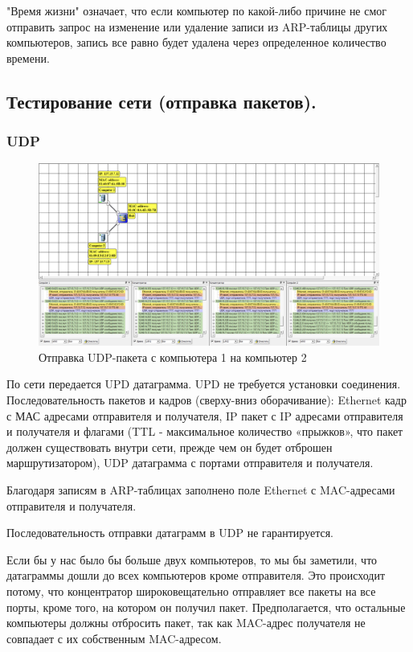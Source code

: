 \documentclass[12pt,onecolumn]{article}
\begin{document}
"Время жизни" означает, что если компьютер по какой-либо причине не смог отправить запрос на изменение или удаление записи из ARP-таблицы других компьютеров, запись все равно будет удалена через определенное количество времени.

\subsection{Тестирование сети (отправка пакетов).}
\subsubsection{UDP}
\begin{figure}[H]
  \centering
  \includegraphics[width=\textwidth]{image/part1/udp-1.png}
  \caption{Отправка UDP-пакета с компьютера 1 на компьютер 2}
\end{figure}
По сети передается UPD датаграмма. UPD не требуется установки
соединения. Последовательность пакетов и кадров (сверху-вниз оборачивание):
Ethernet кадр с МАС адресами отправителя и получателя, IP пакет с IP адресами
отправителя и получателя и флагами (TTL - максимальное количество
«прыжков», что пакет должен существовать внутри сети, прежде чем он будет
отброшен маршрутизатором), UDP датаграмма с портами отправителя и
получателя.

Благодаря записям в ARP-таблицах заполнено поле Ethernet с MAC-адресами отправителя и получателя.

Последовательность отправки датаграмм в UDP не гарантируется.

Если бы у нас было бы больше двух компьютеров, то мы бы заметили, что датаграммы дошли до всех компьютеров кроме отправителя. Это происходит потому, что концентратор широковещательно отправляет все пакеты на все порты, кроме того, на котором он получил пакет.
Предполагается, что остальные компьютеры должны отбросить пакет, так как MAC-адрес получателя не совпадает с их собственным MAC-адресом.
\end{document}
